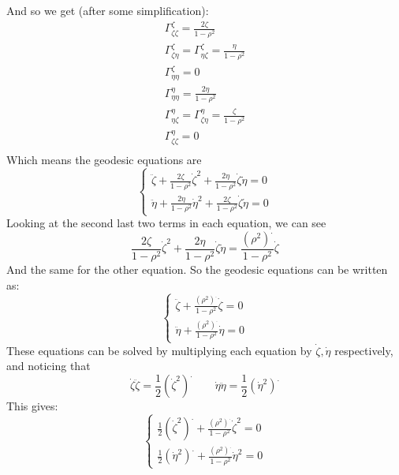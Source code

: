 \documentclass{article}
\begin{document}
And so we get (after some simplification):
\begin{equation}
\begin{gathered}
    \Gamma^\zeta_{\zeta\zeta} = \frac{2\zeta}{1-\rho^2}\\
    \Gamma^\zeta_{\zeta\eta} = \Gamma^\zeta_{\eta\zeta} = \frac{\eta}{1-\rho^2}\\
    \Gamma^\zeta_{\eta\eta} = 0 \\
    \Gamma^\eta_{\eta\eta} = \frac{2\eta}{1-\rho^2}\\
    \Gamma^\eta_{\eta\zeta} = \Gamma^\eta_{\zeta\eta} = \frac{\zeta}{1-\rho^2}\\
    \Gamma^\eta_{\zeta\zeta} = 0 \\
\end{gathered}
\end{equation}
Which means the geodesic equations are
\begin{equation}
    \begin{cases}
        \ddot{\zeta} + \frac{2\zeta}{1-\rho^2}\dot{\zeta}^2 + \frac{2\eta}{1-\rho^2}\dot{\zeta}\dot{\eta} = 0 \\
        \ddot{\eta} + \frac{2\eta}{1-\rho^2}\dot{\eta}^2 + \frac{2\zeta}{1-\rho^2}\dot{\zeta}\dot{\eta} = 0
    \end{cases}
\end{equation}
Looking at the second last two terms in each equation, we can see
\begin{equation}
    \frac{2\zeta}{1-\rho^2}\dot{\zeta}^2 + \frac{2\eta}{1-\rho^2}\dot{\zeta}\dot{\eta} = \frac{\left(\rho^2\right)^{.}}{1-\rho^2}\dot{\zeta}
\end{equation}
And the same for the other equation. So the geodesic equations can be written as:
\begin{equation}
    \begin{cases}
        \ddot{\zeta} + \frac{\left(\rho^2\right)^{.}}{1-\rho^2}\dot{\zeta} = 0 \\
        \ddot{\eta} + \frac{\left(\rho^2\right)^{.}}{1-\rho^2}\dot{\eta} = 0
    \end{cases}
\end{equation}
These equations can be solved by multiplying each equation by $\dot{\zeta}, \dot{\eta}$ respectively, and noticing that
\begin{equation}
    \dot{\zeta}\ddot{\zeta} = \frac{1}{2}\left(\dot{\zeta}^2\right)^{.} \qquad \dot{\eta}\ddot{\eta} = \frac{1}{2}\left(\dot{\eta}^2\right)^{.}
\end{equation}
This gives:
\begin{equation}
    \begin{cases}
        \frac{1}{2}\left(\dot{\zeta}^2\right)^{.} + \frac{\left(\rho^2\right)^{.}}{1-\rho^2}\dot{\zeta}^2 = 0 \\
        \frac{1}{2}\left(\dot{\eta}^2\right)^{.} + \frac{\left(\rho^2\right)^{.}}{1-\rho^2}\dot{\eta}^2 = 0
    \end{cases}
\end{equation}
\end{document}
